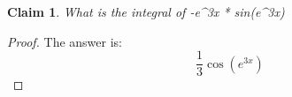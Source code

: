 \documentclass{article}
\newtheorem{theorem}{Claim}
\begin{document}
\begin{theorem}
What is the integral of -e^{3x} * sin(e^{3x})
\end{theorem}

\begin{proof}
The answer is:
\[
\frac{1}{3} \cos \left(e^{3 x}\right)
\]
\end{proof}
\end{document}
